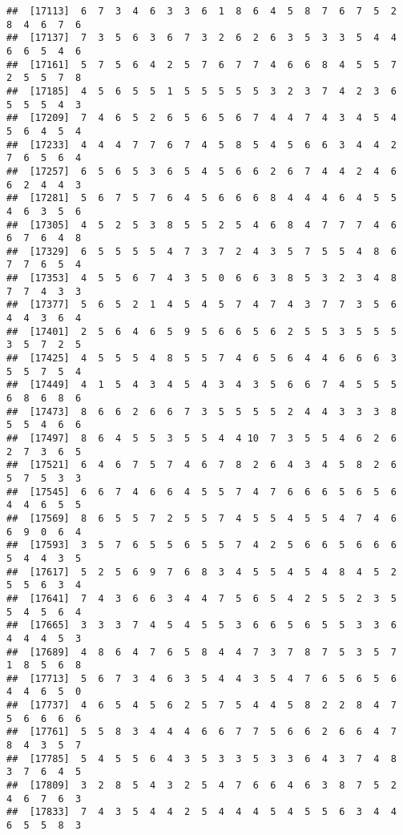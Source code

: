 \documentclass[
]{book}
\begin{document}
\begin{verbatim}
##  [17113]  6  7  3  4  6  3  3  6  1  8  6  4  5  8  7  6  7  5  2  8  4  6  7  6
##  [17137]  7  3  5  6  3  6  7  3  2  6  2  6  3  5  3  3  5  4  4  6  6  5  4  6
##  [17161]  5  7  5  6  4  2  5  7  6  7  7  4  6  6  8  4  5  5  7  2  5  5  7  8
##  [17185]  4  5  6  5  5  1  5  5  5  5  5  3  2  3  7  4  2  3  6  5  5  5  4  3
##  [17209]  7  4  6  5  2  6  5  6  5  6  7  4  4  7  4  3  4  5  4  5  6  4  5  4
##  [17233]  4  4  4  7  7  6  7  4  5  8  5  4  5  6  6  3  4  4  2  7  6  5  6  4
##  [17257]  6  5  6  5  3  6  5  4  5  6  6  2  6  7  4  4  2  4  6  6  2  4  4  3
##  [17281]  5  6  7  5  7  6  4  5  6  6  6  8  4  4  4  6  4  5  5  4  6  3  5  6
##  [17305]  4  5  2  5  3  8  5  5  2  5  4  6  8  4  7  7  7  4  6  6  7  6  4  8
##  [17329]  6  5  5  5  5  4  7  3  7  2  4  3  5  7  5  5  4  8  6  7  7  6  5  4
##  [17353]  4  5  5  6  7  4  3  5  0  6  6  3  8  5  3  2  3  4  8  7  7  4  3  3
##  [17377]  5  6  5  2  1  4  5  4  5  7  4  7  4  3  7  7  3  5  6  4  4  3  6  4
##  [17401]  2  5  6  4  6  5  9  5  6  6  5  6  2  5  5  3  5  5  5  3  5  7  2  5
##  [17425]  4  5  5  5  4  8  5  5  7  4  6  5  6  4  4  6  6  6  3  5  5  7  5  4
##  [17449]  4  1  5  4  3  4  5  4  3  4  3  5  6  6  7  4  5  5  5  6  8  6  8  6
##  [17473]  8  6  6  2  6  6  7  3  5  5  5  5  2  4  4  3  3  3  8  5  5  4  6  6
##  [17497]  8  6  4  5  5  3  5  5  4  4 10  7  3  5  5  4  6  2  6  2  7  3  6  5
##  [17521]  6  4  6  7  5  7  4  6  7  8  2  6  4  3  4  5  8  2  6  5  7  5  3  3
##  [17545]  6  6  7  4  6  6  4  5  5  7  4  7  6  6  6  5  6  5  6  4  4  6  5  5
##  [17569]  8  6  5  5  7  2  5  5  7  4  5  5  4  5  5  4  7  4  6  6  9  0  6  4
##  [17593]  3  5  7  6  5  5  6  5  5  7  4  2  5  6  6  5  6  6  6  5  4  4  3  5
##  [17617]  5  2  5  6  9  7  6  8  3  4  5  5  4  5  4  8  4  5  2  5  5  6  3  4
##  [17641]  7  4  3  6  6  3  4  4  7  5  6  5  4  2  5  5  2  3  5  5  4  5  6  4
##  [17665]  3  3  3  7  4  5  4  5  5  3  6  6  5  6  5  5  3  3  6  4  4  4  5  3
##  [17689]  4  8  6  4  7  6  5  8  4  4  7  3  7  8  7  5  3  5  7  1  8  5  6  8
##  [17713]  5  6  7  3  4  6  3  5  4  4  3  5  4  7  6  5  6  5  6  4  4  6  5  0
##  [17737]  4  6  5  4  5  6  2  5  7  5  4  4  5  8  2  2  8  4  7  5  6  6  6  6
##  [17761]  5  5  8  3  4  4  4  6  6  7  7  5  6  6  2  6  6  4  7  8  4  3  5  7
##  [17785]  5  4  5  5  6  4  3  5  3  3  5  3  3  6  4  3  7  4  8  3  7  6  4  5
##  [17809]  3  2  8  5  4  3  2  5  4  7  6  6  4  6  3  8  7  5  2  4  6  7  6  3
##  [17833]  7  4  3  5  4  4  2  5  4  4  4  5  4  5  5  6  3  4  4  6  5  5  8  3

\end{verbatim}
\end{document}
